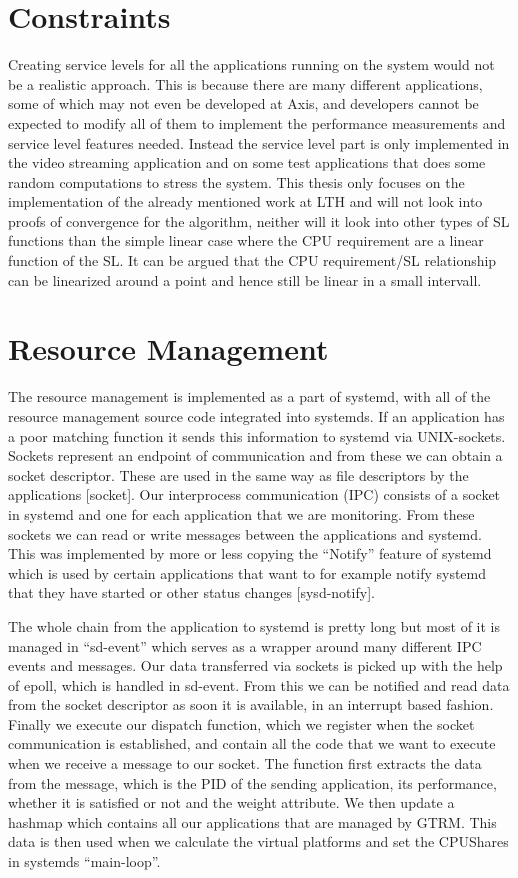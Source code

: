 \documentclass[nobiblatex]{LTHthesis}
\begin{document}
\section{Constraints} %
Creating service levels for all the applications running on the system would not be a realistic approach. This is because there are many different applications, some of which may not even be developed at Axis, and developers cannot be expected to modify all of them to implement the performance measurements and service level features needed. Instead the service level part is only implemented in the video streaming application and on some test applications that does some random computations to stress the system. This thesis only focuses on the implementation of the already mentioned work at LTH and will not look into proofs of convergence for the algorithm, neither will it look into other types of SL functions than the simple linear case where the CPU requirement are a linear function of the SL. It can be argued that the CPU requirement/SL relationship can be linearized around a point and hence still be linear in a small intervall.

\section{Resource Management} 
The resource management is implemented as a part of systemd, with all of the resource management source code integrated into systemds. If an application has a poor matching function it sends this information to systemd via UNIX-sockets. Sockets represent an endpoint of communication and from these we can obtain a socket descriptor. These are used in the same way as file descriptors by the applications [socket]. Our interprocess communication (IPC) consists of a socket in systemd and one for each application that we are monitoring. From these sockets we can read or write messages between the applications and systemd. This was implemented by more or less copying the “Notify” feature of systemd which is used by certain applications that want to for example notify systemd that they have started or other status changes [sysd-notify].

The whole chain from the application to systemd is pretty long but most of it is managed in “sd-event” which serves as a wrapper around many different IPC events and messages. Our data transferred via sockets is picked up with the help of epoll, which is handled in sd-event. From this we can be notified and read data from the socket descriptor as soon it is available, in an interrupt based fashion. Finally we execute our dispatch function, which we register when the socket communication is established, and contain all the code that we want to execute when we receive a message to our socket. The function first extracts the data from the message, which is the PID of the sending application, its performance, whether it is satisfied or not and the weight attribute. We then update a hashmap which contains all our applications that are managed by GTRM. This data is then used when we calculate the virtual platforms and set the CPUShares in systemds “main-loop”.
\end{document}
